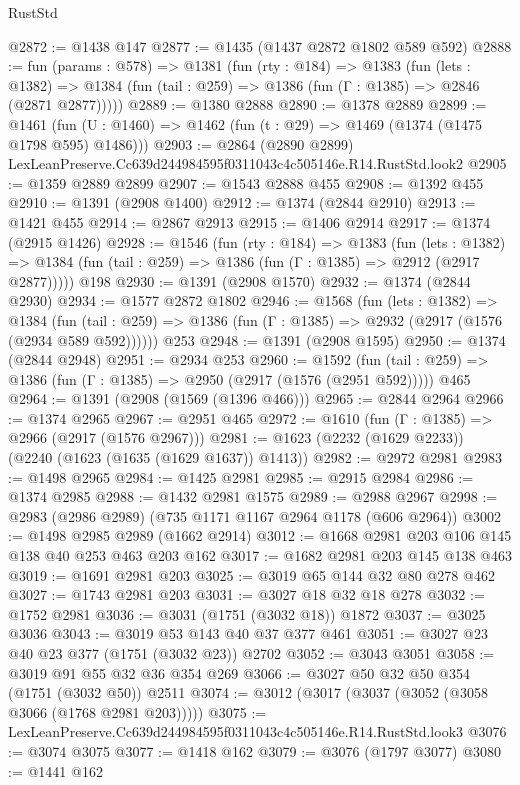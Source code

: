 \begin{lexlean}{RustStd}
\begin{coremodule}
@2872 := @1438 @147
@2877 := @1435 (@1437 @2872 @1802 @589 @592)
@2888 := fun (params : @578) =>
  @1381
    (fun (rty : @184) =>
    @1383
      (fun (lets : @1382) =>
      @1384 (fun (tail : @259) => @1386 (fun (Γ : @1385) => @2846 (@2871 @2877)))))
@2889 := @1380 @2888
@2890 := @1378 @2889
@2899 := @1461 (fun (U : @1460) => @1462 (fun (t : @29) => @1469 (@1374 (@1475 @1798 @595) @1486)))
@2903 := @2864 (@2890 @2899) LexLeanPreserve.Cc639d244984595f0311043c4c505146e.R14.RustStd.look2
@2905 := @1359 @2889 @2899
@2907 := @1543 @2888 @455
@2908 := @1392 @455
@2910 := @1391 (@2908 @1400)
@2912 := @1374 (@2844 @2910)
@2913 := @1421 @455
@2914 := @2867 @2913
@2915 := @1406 @2914
@2917 := @1374 (@2915 @1426)
@2928 := @1546
    (fun (rty : @184) =>
    @1383
      (fun (lets : @1382) =>
      @1384 (fun (tail : @259) => @1386 (fun (Γ : @1385) => @2912 (@2917 @2877)))))
    @198
@2930 := @1391 (@2908 @1570)
@2932 := @1374 (@2844 @2930)
@2934 := @1577 @2872 @1802
@2946 := @1568
    (fun (lets : @1382) =>
    @1384 (fun (tail : @259) => @1386 (fun (Γ : @1385) => @2932 (@2917 (@1576 (@2934 @589 @592))))))
    @253
@2948 := @1391 (@2908 @1595)
@2950 := @1374 (@2844 @2948)
@2951 := @2934 @253
@2960 := @1592
    (fun (tail : @259) => @1386 (fun (Γ : @1385) => @2950 (@2917 (@1576 (@2951 @592)))))
    @465
@2964 := @1391 (@2908 (@1569 (@1396 @466)))
@2965 := @2844 @2964
@2966 := @1374 @2965
@2967 := @2951 @465
@2972 := @1610 (fun (Γ : @1385) => @2966 (@2917 (@1576 @2967)))
@2981 := @1623 (@2232 (@1629 @2233)) (@2240 (@1623 (@1635 (@1629 @1637)) @1413))
@2982 := @2972 @2981
@2983 := @1498 @2965
@2984 := @1425 @2981
@2985 := @2915 @2984
@2986 := @1374 @2985
@2988 := @1432 @2981 @1575
@2989 := @2988 @2967
@2998 := @2983 (@2986 @2989) (@735 @1171 @1167 @2964 @1178 (@606 @2964))
@3002 := @1498 @2985 @2989 (@1662 @2914)
@3012 := @1668 @2981 @203 @106 @145 @138 @40 @253 @463 @203 @162
@3017 := @1682 @2981 @203 @145 @138 @463
@3019 := @1691 @2981 @203
@3025 := @3019 @65 @144 @32 @80 @278 @462
@3027 := @1743 @2981 @203
@3031 := @3027 @18 @32 @18 @278
@3032 := @1752 @2981
@3036 := @3031 (@1751 (@3032 @18)) @1872
@3037 := @3025 @3036
@3043 := @3019 @53 @143 @40 @37 @377 @461
@3051 := @3027 @23 @40 @23 @377 (@1751 (@3032 @23)) @2702
@3052 := @3043 @3051
@3058 := @3019 @91 @55 @32 @36 @354 @269
@3066 := @3027 @50 @32 @50 @354 (@1751 (@3032 @50)) @2511
@3074 := @3012 (@3017 (@3037 (@3052 (@3058 @3066 (@1768 @2981 @203)))))
@3075 := LexLeanPreserve.Cc639d244984595f0311043c4c505146e.R14.RustStd.look3
@3076 := @3074 @3075
@3077 := @1418 @162
@3079 := @3076 (@1797 @3077)
@3080 := @1441 @162

\end{coremodule}
\end{lexlean}
